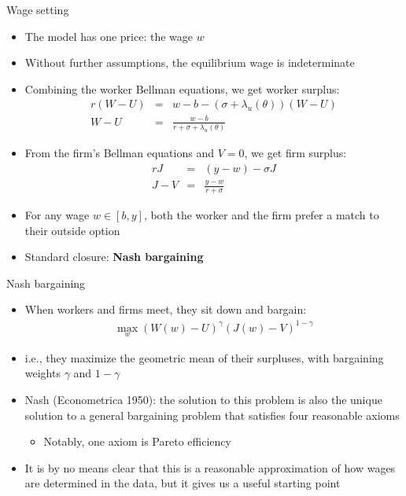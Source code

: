 \documentclass[9pt]{beamer}
\newcommand{\bit}{\begin{itemize}}
\newcommand{\eit}{\end{itemize}}
\begin{document}
\begin{frame}{Wage setting}

\bit
\setlength\itemsep{1.5em}

\item The model has one price: the wage $w$

\item Without further assumptions, the equilibrium wage is indeterminate

\item Combining the worker Bellman equations, we get worker surplus:
\begin{eqnarray}
r(W-U) &=& w-b-(\sigma+\lambda_u(\theta))\left(W-U\right) \nonumber \\
W-U &=& \frac{w-b}{r+\sigma + \lambda_u(\theta)} \nonumber
\end{eqnarray}
\item From the firm's Bellman equations and $V=0$, we get firm surplus:
\begin{eqnarray}
rJ &=& (y-w)  - \sigma J \nonumber \\
J-V &=& \frac{y-w}{r+\sigma}  \nonumber
\end{eqnarray}

\item For any wage $w \in [b,y]$, both the worker and the firm prefer a match to their outside option

\item Standard closure: \bf Nash bargaining \normalfont

\eit
\end{frame}

\begin{frame}{Nash bargaining}

\bit
\setlength\itemsep{1em}

\item When workers and firms meet, they sit down and bargain:
\begin{eqnarray}
\max_{w} \left(W(w)-U\right)^{\gamma} \left(J(w)-V\right)^{1-\gamma} \nonumber
\end{eqnarray}
\item i.e., they maximize the geometric mean of their surpluses, with bargaining weights $\gamma$ and $1-\gamma$

\item Nash (Econometrica 1950): the solution to this problem is also the unique solution to a general bargaining problem that satisfies four reasonable axioms
\bit
	\item Notably, one axiom is Pareto efficiency
\eit

\item It is by no means clear that this is a reasonable approximation of how wages are determined in the data, but it gives us a useful starting point

\eit
\end{frame}
\end{document}
